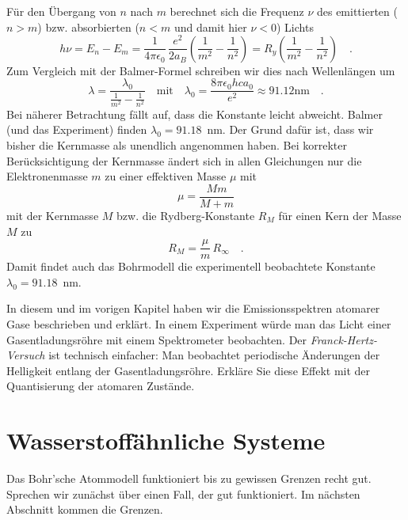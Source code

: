 Für den Übergang von $n$ nach $m$ berechnet sich die Frequenz $\nu$ des emittierten ($n > m$) bzw. absorbierten ($n < m$ und damit hier $\nu < 0$) Lichts
\begin{equation}
    h \nu = E_n - E_m  =   \frac{1}{4 \pi \epsilon_0}  \, \frac{e^2}{2 a_B}  \left( \frac{1}{m^2} - \frac{1}{n^2} \right) 
    = R_y  \left( \frac{1}{m^2} - \frac{1}{n^2} \right)  \quad .
\end{equation}
Zum Vergleich mit der Balmer-Formel schreiben wir dies nach Wellenlängen um
\begin{equation}
    \lambda = \frac{\lambda_0}{\frac{1}{m^2} - \frac{1}{n^2}} \quad \text{mit} \quad \lambda_0 = \frac{8 \pi \epsilon_0 h c a_0}{e^2} \approx 91.12 \text{nm} \quad .
\end{equation}
Bei näherer Betrachtung fällt auf, dass die Konstante leicht abweicht. Balmer (und das Experiment) finden $\lambda_0 = 91.18$~nm. Der Grund dafür ist, dass wir bisher die Kernmasse als unendlich angenommen haben. Bei korrekter Berücksichtigung der Kernmasse ändert sich in allen Gleichungen nur die Elektronenmasse $m$ zu einer effektiven Masse $\mu$ mit
\begin{equation}
    \mu = \frac{M m }{M + m}  
\end{equation} 
mit der Kernmasse $M$ bzw. die Rydberg-Konstante $R_M$ für einen Kern der Masse $M$ zu
\begin{equation}
    R_M = \frac{\mu}{m} \, R_\infty \quad .
\end{equation}
Damit findet auch das Bohrmodell die experimentell beobachtete Konstante $\lambda_0 = 91.18$~nm.




\begin{questions}
 \item In diesem und im vorigen Kapitel haben wir die Emissionsspektren atomarer Gase beschrieben und erklärt. In einem Experiment würde man das Licht einer Gasentladungsröhre mit einem Spektrometer beobachten. 
 Der \emph{Franck-Hertz-Versuch} ist technisch einfacher: Man beobachtet periodische Änderungen der Helligkeit entlang der Gasentladungsröhre. Erkläre Sie diese Effekt mit der Quantisierung der atomaren Zustände.
\end{questions}

\section{Wasserstoffähnliche Systeme}

Das Bohr'sche Atommodell funktioniert bis zu gewissen Grenzen recht gut. Sprechen wir zunächst über einen Fall, der gut funktioniert. Im nächsten Abschnitt kommen die Grenzen.

